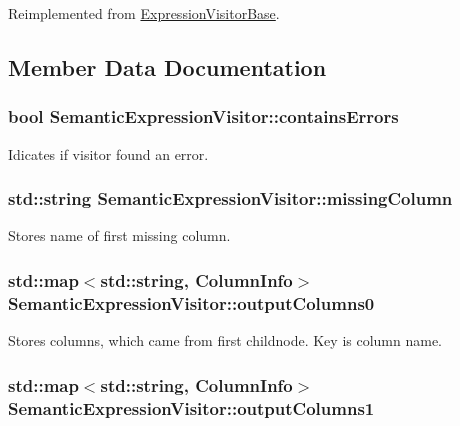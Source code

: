 Reimplemented from \hyperlink{class_expression_visitor_base_a1ac638b82248ff9e1582dbf520dc6ae4}{Expression\+Visitor\+Base}.



\subsection{Member Data Documentation}
\hypertarget{class_semantic_expression_visitor_a5355c2bd3477b4d33bc7ab5443408d11}{
\subsubsection[{contains\+Errors}]{\setlength{\rightskip}{0pt plus 5cm}bool Semantic\+Expression\+Visitor\+::contains\+Errors}}\label{class_semantic_expression_visitor_a5355c2bd3477b4d33bc7ab5443408d11}
Idicates if visitor found an error. \hypertarget{class_semantic_expression_visitor_a2082ef4052d1c35fdda7bcc72c5bb132}{
\subsubsection[{missing\+Column}]{\setlength{\rightskip}{0pt plus 5cm}std\+::string Semantic\+Expression\+Visitor\+::missing\+Column}}\label{class_semantic_expression_visitor_a2082ef4052d1c35fdda7bcc72c5bb132}
Stores name of first missing column. \hypertarget{class_semantic_expression_visitor_a38fc36443e4cabad8039ac58f9934780}{
\subsubsection[{output\+Columns0}]{\setlength{\rightskip}{0pt plus 5cm}std\+::map$<$std\+::string, {\bf Column\+Info}$>$ Semantic\+Expression\+Visitor\+::output\+Columns0}}\label{class_semantic_expression_visitor_a38fc36443e4cabad8039ac58f9934780}
Stores columns, which came from first childnode. Key is column name. \hypertarget{class_semantic_expression_visitor_aca4d42fbadc6310390ccdbe65a0356fd}{
\subsubsection[{output\+Columns1}]{\setlength{\rightskip}{0pt plus 5cm}std\+::map$<$std\+::string, {\bf Column\+Info}$>$ Semantic\+Expression\+Visitor\+::output\+Columns1}}\label{class_semantic_expression_visitor_aca4d42fbadc6310390ccdbe65a0356fd}
